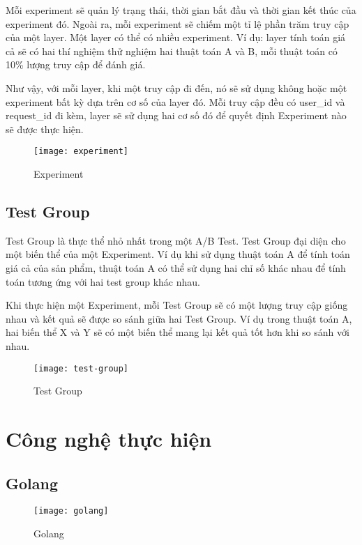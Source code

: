 Mỗi experiment sẽ quản lý trạng thái, thời gian bắt đầu và thời gian kết thúc của experiment đó. Ngoài ra, mỗi experiment sẽ chiếm một tỉ lệ phần trăm truy cập của một layer. Một layer có thể có nhiều experiment. Ví dụ: layer tính toán giá cả sẽ có hai thí nghiệm thử nghiệm hai thuật toán A và B, mỗi thuật toán có 10\% lượng truy cập để đánh giá.

Như vậy, với mỗi layer, khi một truy cập đi đến, nó sẽ sử dụng không hoặc một experiment bất kỳ dựa trên cơ số của layer đó. Mỗi truy cập đều có user\_id và request\_id đi kèm, layer sẽ sử dụng hai cơ số đó để quyết định Experiment nào sẽ được thực hiện.

\begin{figure}[H]
	\centering
	\texttt{[image: experiment]}
	\caption{Experiment}
\end{figure}

\subsection{Test Group}

Test Group là thực thể nhỏ nhất trong một A/B Test. Test Group đại diện cho một biến thể của một Experiment. Ví dụ khi sử dụng thuật toán A để tính toán giá cả của sản phẩm, thuật toán A có thể sử dụng hai chỉ số khác nhau để tính toán tương ứng với hai test group khác nhau.

Khi thực hiện một Experiment, mỗi Test Group sẽ có một lượng truy cập giống nhau và kết quả sẽ được so sánh giữa hai Test Group. Ví dụ trong thuật toán A, hai biến thể X và Y sẽ có một biến thể mang lại kết quả tốt hơn khi so sánh với nhau.

\begin{figure}[H]
	\centering
	\texttt{[image: test-group]}
	\caption{Test Group}
\end{figure}

\section{Công nghệ thực hiện}

\subsection{Golang}

\begin{figure}[H]
	\centering
	\texttt{[image: golang]}
	\caption{Golang}
\end{figure}

